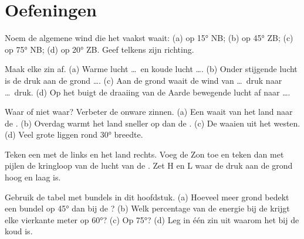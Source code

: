 \section{Oefeningen}

\begin{exercise}[$\star$]\label{exo:g8:winds-global-circulation:1}
Noem de algemene wind die het vaakst waait: (a) op \ang{15} NB; (b) op
\ang{45} ZB; (c) op \ang{75} NB; (d) op \ang{20} ZB. Geef telkens zijn
richting.
\end{exercise}

\begin{exercise}[$\star$]\label{exo:g8:winds-global-circulation:2}
Maak elke zin af. (a) Warme lucht \dots\ en koude lucht \dots. (b) Onder
stijgende lucht is de druk aan de grond \dots. (c) Aan de grond waait de
wind van \dots\ druk naar \dots\ druk. (d) Op het  buigt
de draaiing van de Aarde bewegende lucht af naar \dots.
\end{exercise}

\begin{exercise}[$\star$]\label{exo:g8:winds-global-circulation:3}
Waar of niet waar? Verbeter de onware zinnen. (a) Een  waait van
het land naar de . (b) Overdag warmt het land sneller op dan de .
(c) De  waaien uit het westen. (d) Veel grote 
liggen rond \ang{30} breedte.
\end{exercise}

\begin{exercise}[$\star$]\label{exo:g8:winds-global-circulation:4}
Teken een  met de  links en het land rechts. Voeg de Zon toe en
teken dan met pijlen de kringloop van de lucht van de . Zet H en L
waar de druk aan de grond hoog en laag is.
\end{exercise}

\begin{exercise}[$\star\star$]\label{exo:g8:winds-global-circulation:5}
Gebruik de tabel met bundels in dit hoofdstuk. (a) Hoeveel meer grond
bedekt een bundel op \ang{45} dan bij de ? (b) Welk percentage van
de energie bij de  krijgt elke vierkante meter op \ang{60}? (c) Op
\ang{75}? (d) Leg in één zin uit waarom het bij de  koud is.
\end{exercise}

